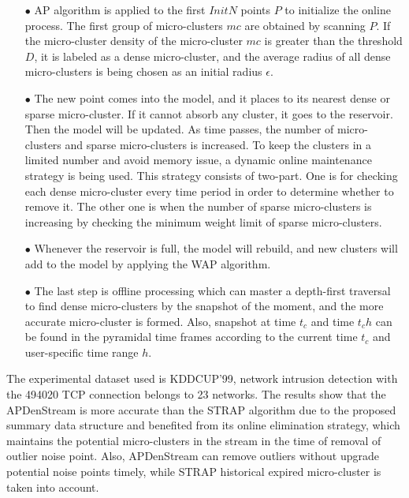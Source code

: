 \begin{itemize}
    \item[$\bullet$] AP algorithm is applied to the first $InitN$ points $P$ to initialize the online process. The first group of micro-clusters $mc$ are obtained by scanning $P$. If the micro-cluster density of the micro-cluster $mc$ is greater than the threshold $D$, it is labeled as a dense micro-cluster, and the average radius of all dense micro-clusters is being chosen as an initial radius $\epsilon$.
    
    \item[$\bullet$] The new point comes into the model, and it places to its nearest dense or sparse micro-cluster. If it cannot absorb any cluster, it goes to the reservoir. Then the model will be updated. As time passes, the number of micro-clusters and sparse micro-clusters is increased. To keep the clusters in a limited number and avoid memory issue, a dynamic online maintenance strategy is being used.  This strategy consists of two-part. One is for checking each dense micro-cluster every time period in order to determine whether to remove it. The other one is when the number of sparse micro-clusters is increasing by checking the minimum weight limit of sparse micro-clusters. 

    \item[$\bullet$] Whenever the reservoir is full, the model will rebuild, and new clusters will add to the model by applying the WAP algorithm.     
    
   \item[$\bullet$] The last step is offline processing which can master a depth-first traversal to find dense micro-clusters by the snapshot of the moment, and the more accurate micro-cluster is formed. Also, snapshot at time $t_c$ and time $t_ch$ can be found in the pyramidal time frames according to the current time $t_c$ and user-specific time range $h$. 
\end{itemize}



The experimental dataset used is KDDCUP'99, network intrusion detection with the 494020 TCP connection belongs to 23 networks. The results show that the APDenStream is more accurate than the STRAP algorithm due to the proposed summary data structure and benefited from its online elimination strategy, which maintains the potential micro-clusters in the stream in the time of removal of outlier noise point.
Also, APDenStream can remove outliers without upgrade potential noise points timely, while STRAP historical expired micro-cluster is taken into account.



